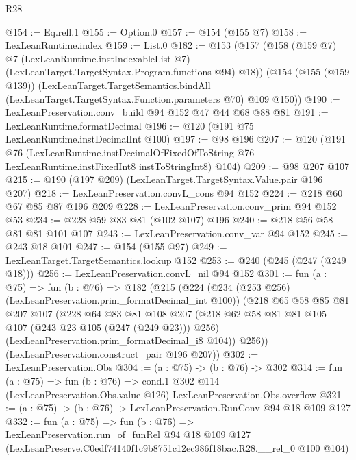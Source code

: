 \begin{lexlean}{R28}
\begin{coremodule}
@154 := Eq.refl.{1}
@155 := Option.{0}
@157 := @154 (@155 @7)
@158 := LexLeanRuntime.index
@159 := List.{0}
@182 := @153
    (@157
      (@158
        (@159 @7)
        @7
        (LexLeanRuntime.instIndexableList @7)
        (LexLeanTarget.TargetSyntax.Program.functions @94)
        @18))
    (@154
      (@155 (@159 @139))
      (LexLeanTarget.TargetSemantics.bindAll
        (LexLeanTarget.TargetSyntax.Function.parameters @70)
        @109
        @150))
@190 := LexLeanPreservation.conv_build @94 @152 @47 @44 @68 @88 @81
@191 := LexLeanRuntime.formatDecimal
@196 := @120 (@191 @75 LexLeanRuntime.instDecimalInt @100)
@197 := @98 @196
@207 := @120
    (@191
      @76
      (LexLeanRuntime.instDecimalOfFixedOfToString
        @76
        LexLeanRuntime.instFixedInt8
        instToStringInt8)
      @104)
@209 := @98 @207 @107
@215 := @190 (@197 @209) (LexLeanTarget.TargetSyntax.Value.pair @196 @207)
@218 := LexLeanPreservation.convL_cons @94 @152
@224 := @218 @60 @67 @85 @87 @196 @209
@228 := LexLeanPreservation.conv_prim @94 @152 @53
@234 := @228 @59 @83 @81 (@102 @107) @196
@240 := @218 @56 @58 @81 @81 @101 @107
@243 := LexLeanPreservation.conv_var @94 @152
@245 := @243 @18 @101
@247 := @154 (@155 @97)
@249 := LexLeanTarget.TargetSemantics.lookup @152
@253 := @240 (@245 (@247 (@249 @18)))
@256 := LexLeanPreservation.convL_nil @94 @152
@301 := fun (a : @75) =>
  fun (b : @76) =>
  @182
    (@215
      (@224
        (@234 (@253 @256) (LexLeanPreservation.prim_formatDecimal_int @100))
        (@218
          @65
          @58
          @85
          @81
          @207
          @107
          (@228
            @64
            @83
            @81
            @108
            @207
            (@218 @62 @58 @81 @81 @105 @107 (@243 @23 @105 (@247 (@249 @23))) @256)
            (LexLeanPreservation.prim_formatDecimal_i8 @104))
          @256))
      (LexLeanPreservation.construct_pair @196 @207))
@302 := LexLeanPreservation.Obs
@304 := (a : @75) -> (b : @76) -> @302
@314 := fun (a : @75) =>
  fun (b : @76) =>
  cond.{1} @302 @114 (LexLeanPreservation.Obs.value @126) LexLeanPreservation.Obs.overflow
@321 := (a : @75) -> (b : @76) -> LexLeanPreservation.RunConv @94 @18 @109 @127
@332 := fun (a : @75) =>
  fun (b : @76) =>
  LexLeanPreservation.run_of_funRel
    @94
    @18
    @109
    @127
    (LexLeanPreserve.C0edf74140f1c9b8751c12ec986f18bac.R28.__rel_0 @100 @104)
\end{coremodule}
\end{lexlean}
